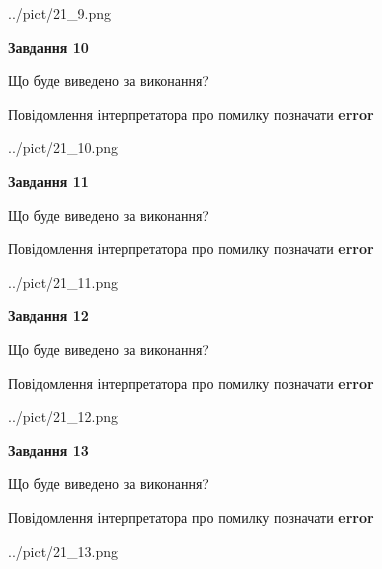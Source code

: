 \documentclass[11pt, ukrainian]{article}
\begin{document}
{\begin {large}
\begin{center}
	{../pict/21_9.png}
\end{center}
\newpage

{\begin {center}\textbf{Завдання 10}\end {center}}\par
Що буде виведено за виконання? \par
Повідомлення інтерпретатора про помилку позначати \textbf{error}

\begin{center}
	{../pict/21_10.png}
\end{center}
\newpage

{\begin {center}\textbf{Завдання 11}\end {center}}\par
Що буде виведено за виконання? \par
Повідомлення інтерпретатора про помилку позначати \textbf{error}

\begin{center}
	{../pict/21_11.png}
\end{center}
\newpage

{\begin {center}\textbf{Завдання 12}\end {center}}\par
Що буде виведено за виконання? \par
Повідомлення інтерпретатора про помилку позначати \textbf{error}

\begin{center}
	{../pict/21_12.png}
\end{center}
\newpage

{\begin {center}\textbf{Завдання 13}\end {center}}\par
Що буде виведено за виконання? \par
Повідомлення інтерпретатора про помилку позначати \textbf{error}

\begin{center}
	{../pict/21_13.png}
\end{center}
\newpage


\end{large}}
\end{document}
